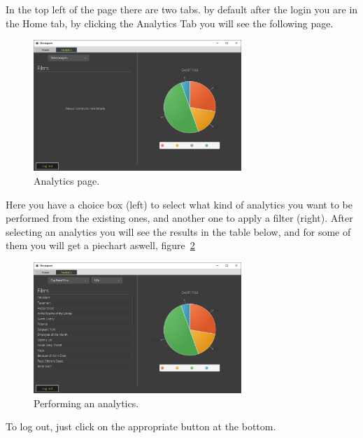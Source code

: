 \documentclass[a4paper, oneside]{article}
\begin{document}
\noindent In the top left of the page there are two tabs. by default after the login you are in the Home tab, by clicking the Analytics Tab you will see the following page.
\begin{figure}[H]
\centering
\includegraphics[width=0.7\textwidth]{./images/screens/screen4} 
\caption{Analytics page.}
\label{fig:screen4}
\end{figure}

\noindent Here you have a choice box (left) to select what kind of analytics you want to be performed from the existing ones, and another one to apply a filter (right). After selecting an analytics you will see the results in the table below, and for some of them you will get a piechart aswell, figure~\ref{fig:screen5}\\
\begin{figure}[H]
\centering
\includegraphics[width=0.7\textwidth]{./images/screens/screen5} 
\caption{Performing an analytics.}
\label{fig:screen5}
\end{figure}

\noindent To log out, just click on the appropriate button at the bottom.

\clearpage
\end{document}
